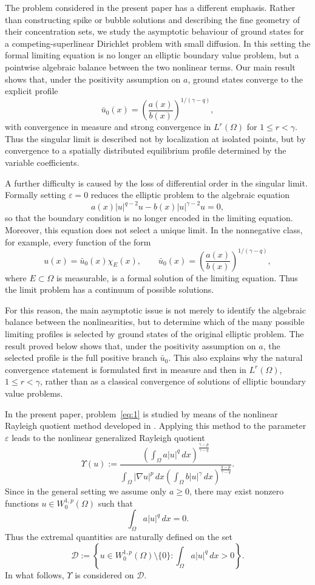 \documentclass[preprint,11pt]{elsarticle}
\numberwithin{equation}{section}
\begin{document}
The problem considered in the present paper has a different emphasis. Rather
than constructing spike or bubble solutions and describing the fine geometry
of their concentration sets, we study the asymptotic behaviour of ground
states for a competing-superlinear Dirichlet problem with small diffusion.
In this setting the formal limiting equation is no longer an elliptic boundary
value problem, but a pointwise algebraic balance between the two nonlinear
terms. Our main result shows that, under the positivity assumption on \(a\),
ground states converge to the explicit profile
\[
\bar u_0(x)
=
\left(\frac{a(x)}{b(x)}\right)^{1/(\gamma-q)},
\]
with convergence in measure and strong convergence in \(L^r(\Omega)\) for
\(1\le r<\gamma\). Thus the singular limit is described not by localization at
isolated points, but by convergence to a spatially distributed equilibrium
profile determined by the variable coefficients.

A further difficulty is caused by the loss of differential order in the
singular limit. Formally setting \(\varepsilon=0\) reduces the elliptic
problem to the algebraic equation
\[
a(x)|u|^{q-2}u-b(x)|u|^{\gamma-2}u=0,
\]
so that the boundary condition is no longer encoded in the limiting equation.
Moreover, this equation does not select a unique limit. In the nonnegative
class, for example, every function of the form
\[
u(x)=\bar u_0(x)\chi_E(x),
\qquad
\bar u_0(x)=\left(\frac{a(x)}{b(x)}\right)^{1/(\gamma-q)},
\]
where \(E\subset\Omega\) is measurable, is a formal solution of the limiting
equation. Thus the limit problem has a continuum of possible solutions.

For this reason, the main asymptotic issue is not merely to identify the
algebraic balance between the nonlinearities, but to determine which of the
many possible limiting profiles is selected by ground states of the original
elliptic problem. The result proved below shows that, under the positivity
assumption on \(a\), the selected profile is the full positive branch
\(\bar u_0\). This also explains why the natural convergence statement is
formulated first in measure and then in \(L^r(\Omega)\), \(1\le r<\gamma\),
rather than as a classical convergence of solutions of elliptic boundary value
problems.

In the present paper, problem~\eqref{eq:1} is studied by means of the
nonlinear Rayleigh quotient method developed in
\cite{ilyaReil,Ilyasov2022}. Applying this method to the parameter
\(\varepsilon\) leads to the nonlinear generalized Rayleigh quotient
\[
\Upsilon(u)
:=
\frac{
	\left(\displaystyle\int_\Omega a|u|^q\,dx\right)^{
		\frac{\gamma-p}{\gamma-q}}
}{
	\displaystyle
	\int_\Omega |\nabla u|^p\,dx
	\left(\displaystyle\int_\Omega b|u|^\gamma\,dx\right)^{
		\frac{q-p}{\gamma-q}}
}.
\]
Since in the general setting we assume only \(a\ge0\), there may exist
nonzero functions \(u\in W^{1,p}_0(\Omega)\) such that
\[
\int_\Omega a|u|^q\,dx=0.
\]
Thus the extremal quantities are naturally defined on the set
\[
\mathcal D
:=
\left\{
u\in W^{1,p}_0(\Omega)\setminus\{0\}:
\int_\Omega a|u|^q\,dx>0
\right\}.
\]
In what follows, \(\Upsilon\) is considered on \(\mathcal D\).
\end{document}
